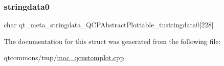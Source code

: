 \subsubsection{\texorpdfstring{stringdata0}{stringdata0}}
{\footnotesize\ttfamily char qt\+\_\+meta\+\_\+stringdata\+\_\+\+Q\+C\+P\+Abstract\+Plottable\+\_\+t\+::stringdata0\mbox{[}228\mbox{]}}



The documentation for this struct was generated from the following file\+:\begin{DoxyCompactItemize}
\item 
qtcommons/tmp/\mbox{\hyperlink{moc__qcustomplot_8cpp}{moc\+\_\+qcustomplot.\+cpp}}\end{DoxyCompactItemize}
